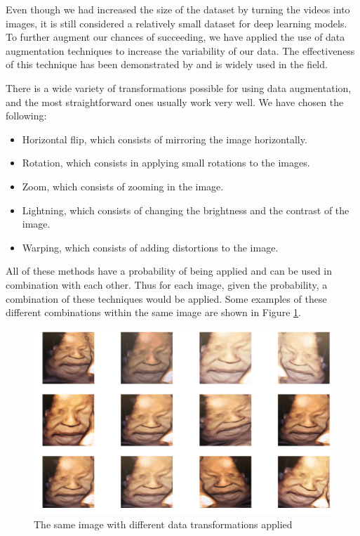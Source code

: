 Even though we had increased the size of the dataset by turning the videos into images, it is still considered a relatively small dataset for deep learning models. To further augment our chances of succeeding, we have applied the use of data augmentation techniques to increase the variability of our data. The effectiveness of this technique has been demonstrated by \cite{abs-1712-04621} and is widely used in the field.

There is a wide variety of transformations possible for using data augmentation, and the most straightforward ones usually work very well. We have chosen the following:

\begin{itemize}
    \item Horizontal flip, which consists of mirroring the image horizontally. 
    \item Rotation, which consists in applying small rotations to the images.
    \item Zoom, which consists of zooming in the image.
    \item Lightning, which consists of changing the brightness and the contrast of the image.
    \item Warping, which consists of adding distortions to the image. 
\end{itemize}

All of these methods have a probability of being applied and can be used in combination with each other. Thus for each image, given the probability, a combination of these techniques would be applied. Some examples of these different combinations within the same image are shown in Figure \ref{fig:data_augmentation}.

\begin{figure}[h!tp]
    \centering
    \includegraphics[width=.9\textwidth]{imgs/chap3_data_augmentation.png}
    \caption{The same image with different data transformations applied}
    \label{fig:data_augmentation}
\end{figure}

